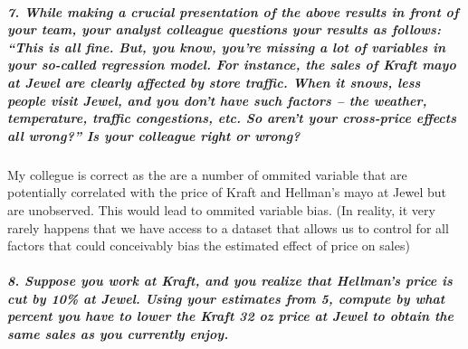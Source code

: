 \documentclass[]{article}
\let\oldsubparagraph\subparagraph
\renewcommand{\subparagraph}[1]{\oldsubparagraph{#1}\mbox{}}
\begin{document}
\hypertarget{while-making-a-crucial-presentation-of-the-above-results-in-front-of-your-team-your-analyst-colleague-questions-your-results-as-follows-this-is-all-fine.-but-you-know-youre-missing-a-lot-of-variables-in-your-so-called-regression-model.-for-instance-the-sales-of-kraft-mayo-at-jewel-are-clearly-affected-by-store-traffic.-when-it-snows-less-people-visit-jewel-and-you-dont-have-such-factors-the-weather-temperature-traffic-congestions-etc.-so-arent-your-cross-price-effects-all-wrong-is-your-colleague-right-or-wrong}{%
\subparagraph{7. While making a crucial presentation of the above
results in front of your team, your analyst colleague questions your
results as follows: ``This is all fine. But, you know, you're missing a
lot of variables in your so-called regression model. For instance, the
sales of Kraft mayo at Jewel are clearly affected by store traffic. When
it snows, less people visit Jewel, and you don't have such factors --
the weather, temperature, traffic congestions, etc. So aren't your
cross-price effects all wrong?'' Is your colleague right or
wrong?}\label{while-making-a-crucial-presentation-of-the-above-results-in-front-of-your-team-your-analyst-colleague-questions-your-results-as-follows-this-is-all-fine.-but-you-know-youre-missing-a-lot-of-variables-in-your-so-called-regression-model.-for-instance-the-sales-of-kraft-mayo-at-jewel-are-clearly-affected-by-store-traffic.-when-it-snows-less-people-visit-jewel-and-you-dont-have-such-factors-the-weather-temperature-traffic-congestions-etc.-so-arent-your-cross-price-effects-all-wrong-is-your-colleague-right-or-wrong}}

My collegue is correct as the are a number of ommited variable that are
potentially correlated with the price of Kraft and Hellman's mayo at
Jewel but are unobserved. This would lead to ommited variable bias. (In
reality, it very rarely happens that we have access to a dataset that
allows us to control for all factors that could conceivably bias the
estimated effect of price on sales)

\hypertarget{suppose-you-work-at-kraft-and-you-realize-that-hellmans-price-is-cut-by-10-at-jewel.-using-your-estimates-from-5-compute-by-what-percent-you-have-to-lower-the-kraft-32-oz-price-at-jewel-to-obtain-the-same-sales-as-you-currently-enjoy.}{%
\subparagraph{8. Suppose you work at Kraft, and you realize that
Hellman's price is cut by 10\% at Jewel. Using your estimates from 5,
compute by what percent you have to lower the Kraft 32 oz price at Jewel
to obtain the same sales as you currently
enjoy.}\label{suppose-you-work-at-kraft-and-you-realize-that-hellmans-price-is-cut-by-10-at-jewel.-using-your-estimates-from-5-compute-by-what-percent-you-have-to-lower-the-kraft-32-oz-price-at-jewel-to-obtain-the-same-sales-as-you-currently-enjoy.}}
\end{document}
